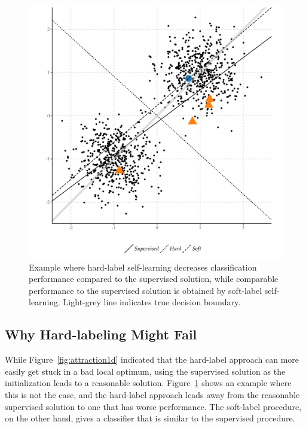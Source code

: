 \documentclass[twoside]{memoir}\usepackage[]{graphicx}\usepackage{xcolor}
\makeatletter
\def\maxwidth{ %
  \ifdim\Gin@nat@width>\linewidth
    \linewidth
  \else
    \Gin@nat@width
  \fi
}
\newenvironment{knitrout}{}{} %
\makeatother
\begin{document}
\begin{knitrout}
\color{fgcolor}\begin{figure}
\includegraphics[width=\maxwidth]{figure/example-1} \caption[Example where hard-label self-learning decreases classification performance compared to the supervised solution, while comparable performance to the supervised solution is obtained by soft-label self-learning]{Example where hard-label self-learning decreases classification performance compared to the supervised solution, while comparable performance to the supervised solution is obtained by soft-label self-learning. Light-grey line indicates true decision boundary.}\label{fig:example}
\end{figure}


\end{knitrout}


\subsection{Why Hard-labeling Might Fail}
While Figure~\ref{fig:attraction1d} indicated that the hard-label approach can more easily get stuck in a bad local optimum, using the supervised solution as the initialization leads to a reasonable solution. Figure~\ref{fig:example} shows an example where this is not the case, and the hard-label approach leads away from the reasonable supervised solution to one that has worse performance. The soft-label procedure, on the other hand, gives a classifier that is similar to the supervised procedure.
\end{document}
